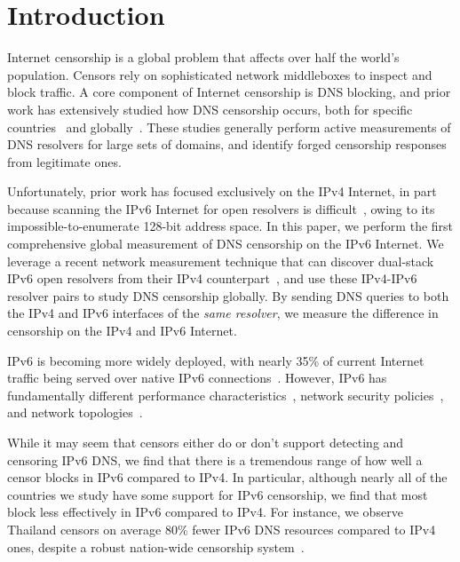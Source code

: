 \section{Introduction}\label{sec:intro}

Internet censorship is a global problem that affects over half the world's
population. Censors rely on sophisticated network middleboxes to inspect and
block traffic. A core component of Internet censorship is DNS blocking, and
prior work has extensively studied how DNS censorship occurs, both for specific
countries~\cite{Anonymous2020:TripletCensors,USESEC21:GFWatch} and
globally~\cite{kuhrer2015going,dagon2008corrupted,pearce2017global,scott2016satellite}.
%
These studies generally perform active measurements of DNS resolvers for large
sets of domains, and identify forged censorship responses from legitimate ones.

Unfortunately, prior work has focused exclusively on the IPv4 Internet, in part
because scanning the IPv6 Internet for open resolvers is
difficult~\cite{murdock2017target}, owing to its impossible-to-enumerate 128-bit
address space.
%
In this paper, we perform the first comprehensive global measurement of DNS
censorship on the IPv6 Internet. We leverage a recent network measurement
technique that can discover dual-stack IPv6 open resolvers from their IPv4
counterpart~\cite{hendriks2017potential}, and use these IPv4-IPv6 resolver pairs
to study DNS censorship globally. By sending DNS queries to both the IPv4 and IPv6
interfaces of the \emph{same resolver}, we measure the difference in
censorship on the IPv4 and IPv6 Internet.

\medskip

IPv6 is becoming more widely deployed, with nearly 35\% of current Internet
traffic being served over native IPv6 connections~\cite{Google-IPv6}. However,
IPv6 has fundamentally different performance
characteristics~\cite{Dhamdhere-IMC2012}, network security
policies~\cite{Czyz-NDSS2016}, and network topologies~\cite{Czyz-SIGCOMM2014}.

While it may seem that censors either do or don't support detecting and
censoring IPv6 DNS, we find that there is a tremendous range of how well a
censor blocks in IPv6 compared to IPv4.
%
In particular, although nearly all of the countries we study have some support
for IPv6 censorship, we find that most block less effectively in IPv6 compared
to IPv4. For instance, we observe Thailand censors on average 80\% fewer IPv6 DNS
resources compared to IPv4 ones, despite a robust nation-wide censorship
system~\cite{gebhart2017internet}.


